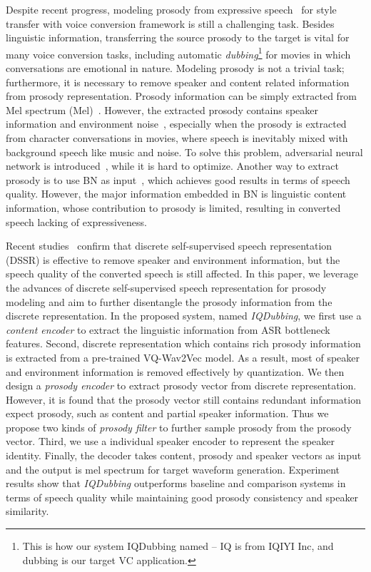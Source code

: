 \documentclass{article}
\begin{document}
Despite recent progress, modeling prosody from expressive speech~\cite{du2021expressive} for style transfer with voice conversion framework is still a challenging task. Besides linguistic information, transferring the source prosody to the target is vital for many voice conversion tasks, including automatic \textit{dubbing}\footnote{This is how our system IQDubbing named -- IQ is from IQIYI Inc, and dubbing is our target VC application.} for movies in which conversations are emotional in nature. Modeling prosody is not a trivial task; furthermore, it is necessary to remove speaker and content related information from prosody representation. Prosody information can be simply extracted from Mel spectrum (Mel)~\cite{skerry2018towards}. However, the extracted prosody contains speaker information and environment noise~\cite{wang2018style}, especially when the prosody is extracted from character conversations in movies, where speech is inevitably mixed with background speech like music and noise. To solve this problem, adversarial neural network is introduced~\cite{li2021ppg}, while it is hard to optimize. Another way to extract prosody is to use BN as input~\cite{wang2021enriching}, which achieves good results in terms of speech quality. However, the major information embedded in BN is linguistic content information, whose contribution to prosody is limited, resulting in converted speech lacking of expressiveness.

Recent studies~\cite{huang2021any, 2019Unsupervised} confirm that discrete self-supervised speech representation (DSSR) is effective to remove  speaker and environment information, but the speech quality of the converted speech is still affected. In this paper, we leverage the advances of discrete self-supervised speech representation for prosody modeling and aim to further disentangle the prosody information from the discrete representation. In the proposed system, named \textit{IQDubbing}, we first use a \textit{content encoder} to extract the linguistic information from ASR bottleneck features. Second, discrete representation which contains rich prosody information is extracted from a pre-trained VQ-Wav2Vec model. As a result, most of speaker and environment information is removed effectively by quantization. We then design a \textit{prosody encoder} to extract prosody vector from discrete representation. However, it is found that the prosody vector still contains redundant information expect prosody, such as content and partial speaker information. Thus we propose two kinds of \textit{prosody filter} to further sample prosody from the prosody vector. Third, we use a individual speaker encoder to represent the speaker identity. Finally, the decoder takes content, prosody and speaker vectors as input and the output is mel spectrum for target waveform generation. Experiment results show that \textit{IQDubbing} outperforms  baseline and comparison systems in terms of speech quality while maintaining good prosody consistency and speaker similarity.
\end{document}
